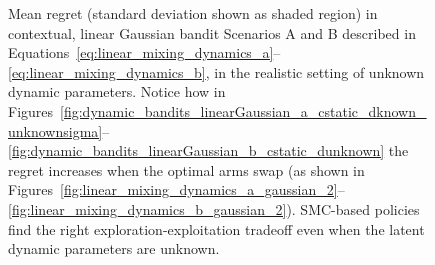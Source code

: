 \begin{figure}[!h]
\begin{subfigure}[b]{0.47\textwidth}
	\end{subfigure}
	\caption{
		Mean regret (standard deviation shown as shaded region) in contextual, linear Gaussian bandit Scenarios A and B
		described in Equations~\eqref{eq:linear_mixing_dynamics_a}--\eqref{eq:linear_mixing_dynamics_b},
		in the realistic setting of unknown dynamic parameters.
		Notice how
			in Figures~\ref{fig:dynamic_bandits_linearGaussian_a_cstatic_dknown_unknownsigma}--\ref{fig:dynamic_bandits_linearGaussian_b_cstatic_dunknown}
		the regret increases when the optimal arms swap
			(as shown in Figures~\ref{fig:linear_mixing_dynamics_a_gaussian_2}--\ref{fig:linear_mixing_dynamics_b_gaussian_2}).
		SMC-based policies find the right exploration-exploitation tradeoff even when the latent dynamic parameters are unknown.}
	\label{fig:dynamic_bandits_linearGaussian_dunknown}
\end{figure}
